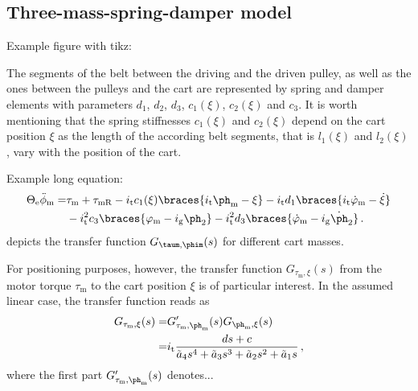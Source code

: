 \subsection{Three-mass-spring-damper model}
\label{sec:diff_3_mass}
Example figure with tikz: 

The segments of the belt between the driving and the driven pulley, as well as the ones between the pulleys and the cart are represented by spring and damper elements with parameters $d_1$, $d_2$, $d_3$, $c_1(\xi)$, $c_2(\xi)$ and $c_3$. It is worth mentioning that the spring stiffnesses $c_1(\xi)$ and $c_2(\xi)$ depend on the cart position $\xi$ as the length of the according belt segments, that is $l_1(\xi)$ and $l_2(\xi)$, vary with the position of the cart.

Example long equation:
\begin{align}
\begin{split}
\Theta_\text{e}\ddot{\phi}_\text{m}=&\tau_\text{m}+\tau_\text{mR}-i_\text{t}c_1(\xi)\braces{i_\text{t}\ph_\text{m}-\xi}-i_\text{t}d_1\braces{i_\text{t}\dot{\varphi}_\text{m}-\dot{\xi}}\\&-i^2_\text{t}c_3\braces{\varphi_\text{m}-i_\text{g}\ph_2}-i^2_\text{t}d_3\braces{\dot{\varphi}_\text{m}-i_\text{g}\dot{\ph}_2}\,.
\label{eq:drall_1}
\end{split}
\end{align}
 depicts the transfer function $G_{\taum,\phim}(s)$ for different cart masses.
 

 
For positioning purposes, however, the transfer function $G_{\tau_\text{m},\xi}(s)$ from the motor torque $\tau_\text{m}$ to the cart position $\xi$ is of particular interest. In the assumed linear case, the transfer function reads as
\begin{alignat}{3}
	\nonumber G_{\tau_\text{m},\xi}(s)=&G'_{\tau_\text{m},\ph_\text{m}}(s)G_{\ph_\text{m},\xi}(s)\\=&i_\text{t}\frac{ds+c}{\tilde{a}_{4}s^4+\tilde{a}_{3}s^3+\tilde{a}_{2}s^2+\tilde{a}_{1}s}\,,
\end{alignat} 
where the first part $G'_{\tau_\text{m},\ph_\text{m}}(s)$ denotes... 